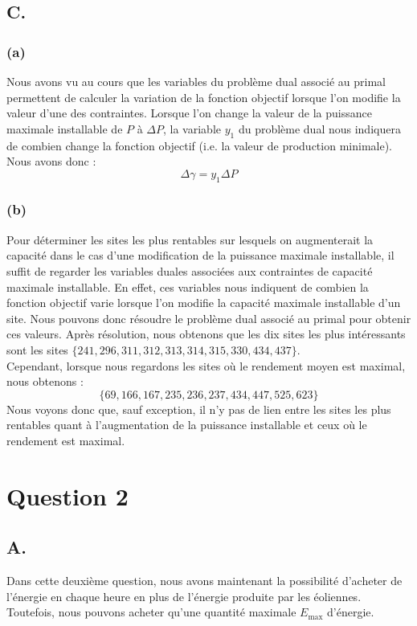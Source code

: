 \documentclass{article}
\begin{document}
\subsection*{C.}
\subsubsection*{(a)}
Nous avons vu au cours que les variables du problème dual associé au primal permettent de calculer la variation de la fonction objectif
lorsque l'on modifie la valeur d'une des contraintes. Lorsque l'on change la valeur de la puissance maximale installable de $P$ à $\Delta P$, la variable $y_1$ du problème dual nous indiquera de combien change
la fonction objectif (i.e. la valeur de production minimale). Nous avons donc :
\begin{equation*}
    \Delta \gamma = y_1 \Delta P
\end{equation*}

\subsubsection*{(b)}
Pour déterminer les sites les plus rentables sur lesquels on augmenterait la capacité dans le cas d'une modification de la puissance maximale installable, il suffit de regarder les variables duales associées aux contraintes de capacité maximale installable. En effet, ces variables nous indiquent de combien la fonction objectif varie lorsque l'on modifie la capacité maximale installable d'un site.
Nous pouvons donc résoudre le problème dual associé au primal pour obtenir ces valeurs. Après résolution, nous obtenons que les dix sites les plus intéressants sont les sites $\{241, 296, 311, 312, 313, 314, 315, 330, 434, 437\}$.\\
Cependant, lorsque nous regardons les sites où le rendement moyen est maximal, nous obtenons : $$\{ 69, 166, 167, 235, 236, 237, 434, 447, 525, 623 \}$$
Nous voyons donc que, sauf exception, il n'y pas de lien entre les sites les plus rentables quant à l'augmentation de la puissance installable et ceux où le rendement est maximal.

\section*{Question 2}

\subsection*{A.}
Dans cette deuxième question, nous avons maintenant la possibilité
d'acheter de l'énergie en chaque heure en plus de l'énergie produite par les éoliennes.
Toutefois, nous pouvons acheter qu'une quantité maximale $E_{\text{max}}$ d'énergie.\\
\end{document}
